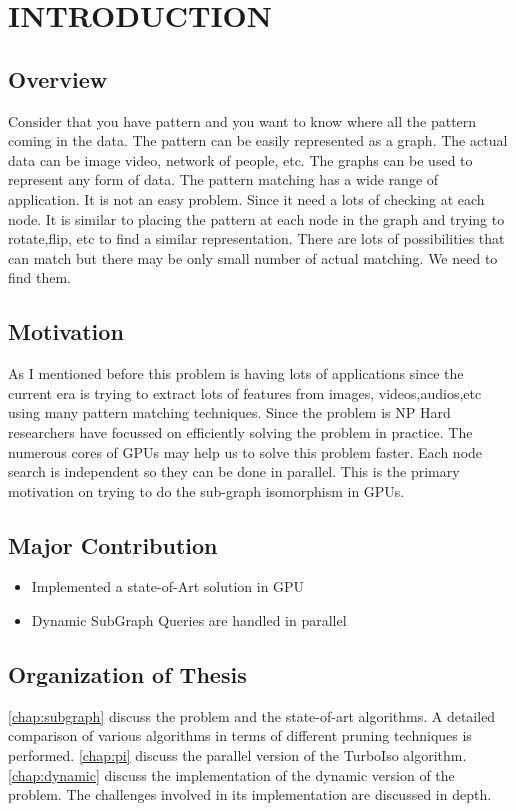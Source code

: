 \chapter{INTRODUCTION}
\label{chap:intro}
\section{Overview}
Consider that you have pattern and you want to know where all the pattern coming in the data. The pattern can be easily represented as a graph. The actual data can be image video, network of people, etc. The graphs can be used to represent any form of data. The pattern matching has a wide range of application. It is not an easy problem. Since it need a lots of checking at each node. It is similar to placing the pattern at each node in the graph and trying to rotate,flip, etc to find a similar representation. There are lots of possibilities that can match but there may be only small number of actual matching. We need to find them.
\section{Motivation}
As I mentioned before this problem is having lots of applications since the current era is trying to extract lots of features from images, videos,audios,etc using many pattern matching techniques.  Since the problem is NP Hard researchers have focussed on efficiently solving the problem in practice. The numerous cores of GPUs may help us to solve this problem faster. Each node search is independent so they can be done in parallel. This is the  primary motivation on trying to do the sub-graph isomorphism in GPUs. 
\section{Major Contribution}
\begin{itemize}
	\item{Implemented a state-of-Art solution in GPU}
	\item{Dynamic SubGraph Queries are handled in parallel}
\end{itemize}

\section{Organization of Thesis}
	\ref{chap:subgraph} discuss the problem and the state-of-art algorithms. A detailed comparison of various algorithms in terms of different pruning techniques is performed. \ref{chap:pi} discuss the parallel version of the TurboIso algorithm. \ref{chap:dynamic} discuss the implementation of the dynamic version of the problem. The challenges involved in its implementation are discussed in depth.